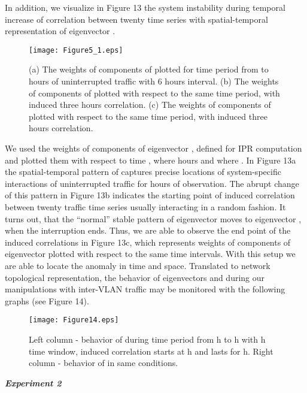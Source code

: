 \documentclass{IEEEtran}
\begin{document}
In addition, we visualize in Figure 13 the system instability during
temporal increase of correlation between twenty time series with spatial-temporal
representation of eigenvector . \begin{figure}[h]
\begin{center}\texttt{[image: Figure5\_1.eps]}\end{center}


\caption{\label{13} (a) The weights of components of  plotted for
time period from  to  hours of uninterrupted traffic with
6 hours interval. (b) The weights of components of  plotted
with respect to the same time period, with induced three hours correlation.
(c) The weights of components of  plotted with respect to
the same time period, with induced three hours correlation.}
\end{figure}
We used the weights of components of eigenvector , defined
for IPR computation and plotted them with respect to time ,
where  hours and  where .
In Figure 13a the spatial-temporal pattern of  captures
precise locations of system-specific interactions of uninterrupted
traffic for  hours of observation. The abrupt change of this
pattern in Figure 13b indicates the starting point of induced correlation
between twenty traffic time series usually interacting in a random
fashion. It turns out, that the {}``normal'' stable pattern of eigenvector
 moves to eigenvector , when the interruption
ends. Thus, we are able to observe the end point of the induced correlations
in Figure 13c, which represents weights of components of eigenvector
 plotted with respect to the same time intervals. With this
setup we are able to locate the anomaly in time and space. Translated
to network topological representation, the behavior of eigenvectors
and  during our manipulations with inter-VLAN
traffic may be monitored with the following graphs (see Figure 14).\begin{figure}[h]
\begin{center}\texttt{[image: Figure14.eps]}\end{center}


\caption{\label{14} Left column - behavior of  during time period
from h to h with h time window, induced correlation
starts at h and lasts for h. Right column - behavior of 
in same conditions.}
\end{figure}
 

\textbf{\emph{Experiment 2}}
\end{document}
